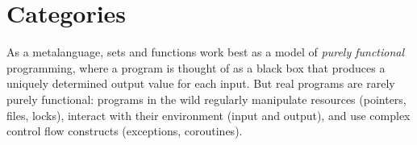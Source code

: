 

\chapter{Categories}

As a metalanguage, sets and functions work best as a model of \emph{purely functional} programming,
where a program is thought of as a black box that produces a uniquely determined output value
for each input.
But real programs are rarely purely functional:
programs in the wild regularly manipulate resources (pointers, files, locks),
interact with their environment (input and output),
and use complex control flow constructs (exceptions, coroutines).

